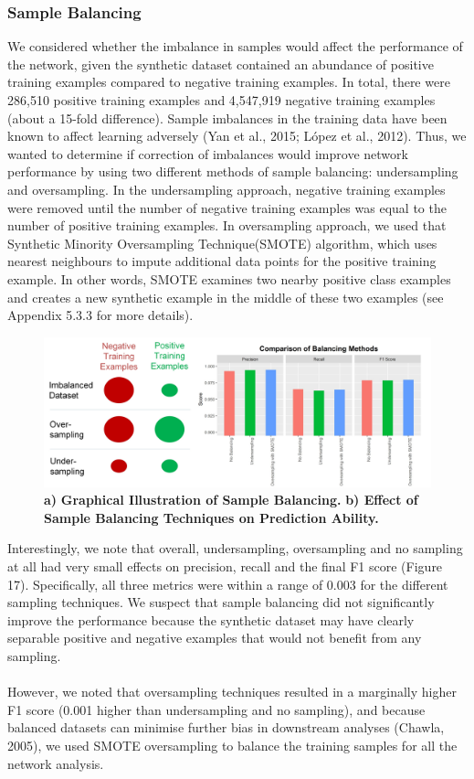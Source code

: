 \documentclass{article}
\begin{document}
\subsubsection{Sample Balancing}
We considered whether the imbalance in samples would affect the performance of the network, given the synthetic dataset contained an abundance of positive training examples compared to negative training examples. In total, there were 286,510 positive training examples and 4,547,919 negative training examples (about a 15-fold difference). Sample imbalances in the training data have been known to affect learning adversely (Yan et al., 2015; López et al., 2012). Thus, we wanted to determine if correction of imbalances would improve network performance by using two different methods of sample balancing: undersampling and oversampling. In the undersampling approach, negative training examples were removed until the number of negative training examples was equal to the number of positive training examples. In oversampling approach, we used that Synthetic Minority Oversampling Technique(SMOTE) algorithm, which uses nearest neighbours to impute additional data points for the positive training example. In other words, SMOTE examines two nearby positive class examples and creates a new synthetic example in the middle of these two examples (see Appendix 5.3.3 for more details).
\begin{figure}[H]
\centering
\includegraphics[width=\textwidth]{comparisonofbalancingmethods.jpg}
\caption{\textbf{a)} \textbf{Graphical Illustration of Sample Balancing.} \textbf{b) Effect of Sample Balancing Techniques on Prediction Ability.}}
\end{figure}
Interestingly, we note that overall, undersampling, oversampling and no sampling at all had very small effects on precision, recall and the final F1 score (Figure 17). Specifically, all three metrics were within a range of 0.003 for the different sampling techniques. We suspect that sample balancing did not significantly improve the performance because the synthetic dataset may have clearly separable positive and negative examples that would not benefit from any sampling.\\\\
However, we noted that oversampling techniques resulted in a marginally higher F1 score (0.001 higher than undersampling and no sampling), and because balanced datasets can minimise further bias in downstream analyses (Chawla, 2005), we used SMOTE oversampling to balance the training samples for all the network analysis.
\end{document}
